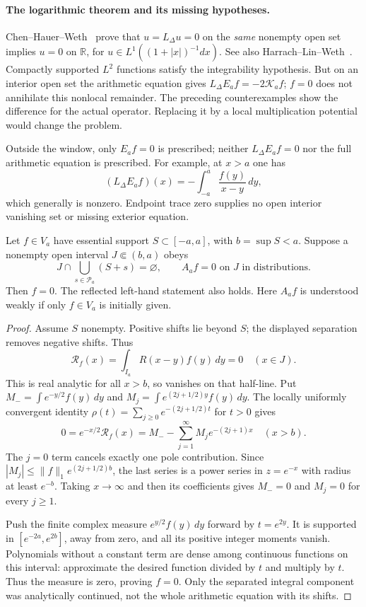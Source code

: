 \paragraph{The logarithmic theorem and its missing hypotheses.}
Chen--Hauer--Weth~\cite[Theorem 1.7]{ChenHauerWeth2023} prove that
$u=L_\Delta u=0$ on the \emph{same} nonempty open set implies $u=0$
on $\mathbb R$, for $u\in L^1((1+|x|)^{-1}dx)$.
See also Harrach--Lin--Weth~\cite[Proposition 4.1]{HarrachLinWeth2025}.
Compactly supported $L^2$ functions satisfy the integrability hypothesis.
But on an interior open set the arithmetic equation gives
$L_\Delta E_af=-2\mathcal K_a f$; $f=0$ does not annihilate this
nonlocal remainder. The preceding counterexamples show the difference
for the actual operator. Replacing it by a local multiplication
potential would change the problem.

Outside the window, only $E_af=0$ is prescribed; neither
$L_\Delta E_af=0$ nor the full arithmetic equation is prescribed.
For example, at $x>a$ one has
\[
 (L_\Delta E_af)(x)=-\int_{-a}^a\frac{f(y)}{x-y}\,dy,
\]
which generally is nonzero. Endpoint trace zero supplies no open
interior vanishing set or missing exterior equation.

\begin{proposition}
\label{prop:ns55-prime-free-cell}
Let $f\in V_a$ have essential support $S\subset[-a,a]$, with
$b=\sup S<a$. Suppose a nonempty open interval $J\Subset(b,a)$ obeys
\[
 J\cap\bigcup_{s\in\mathcal P_a}(S+s)=\varnothing,\qquad
 A_af=0\text{ on }J\text{ in distributions}.
\]
Then $f=0$. The reflected left-hand statement also holds.
Here $A_af$ is understood weakly if only $f\in V_a$ is initially given.
\end{proposition}
\begin{proof}
Assume $S$ nonempty. Positive shifts lie beyond $S$; the displayed
separation removes negative shifts. Thus
\[
 \mathcal R_f(x)=\int_{I_a}R(x-y)f(y)\,dy=0\quad(x\in J).
\]
This is real analytic for all $x>b$, so vanishes on that half-line.
Put
$M_-=\int e^{-y/2}f(y)\,dy$ and
$M_j=\int e^{(2j+1/2)y}f(y)\,dy$.
The locally uniformly convergent identity
$\rho(t)=\sum_{j\ge0}e^{-(2j+1/2)t}$ for $t>0$ gives
\[
 0=e^{-x/2}\mathcal R_f(x)
   =M_- -\sum_{j=1}^\infty M_j e^{-(2j+1)x}\quad(x>b).
\]
The $j=0$ term cancels exactly one pole contribution. Since
$|M_j|\le\|f\|_1e^{(2j+1/2)b}$, the last series is a power
series in $z=e^{-x}$ with radius at least $e^{-b}$.
Taking $x\to\infty$ and then its coefficients gives $M_-=0$
and $M_j=0$ for every $j\ge1$.

Push the finite complex measure $e^{y/2}f(y)\,dy$ forward by
$t=e^{2y}$. It is supported in $[e^{-2a},e^{2b}]$, away from zero,
and all its positive integer moments vanish. Polynomials without a
constant term are dense among continuous functions on this interval:
approximate the desired function divided by $t$ and multiply by $t$.
Thus the measure is zero, proving $f=0$.
Only the separated integral component was analytically continued,
not the whole arithmetic equation with its shifts.
\end{proof}

